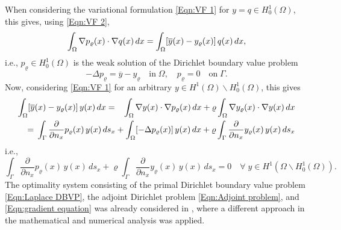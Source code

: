 \documentclass{article}
\numberwithin{equation}{section}
\begin{document}
\noindent
When considering the variational formulation \eqref{Eqn:VF 1}
for $y = q \in H^1_0(\Omega)$, this gives, using \eqref{Eqn:VF 2},
\[
  \int_\Omega \nabla p_\varrho(x) \cdot \nabla q(x) \, dx \\
  =
  \int_\Omega [\overline{y}(x) - y_\varrho(x)] \, q(x) \, dx,
\]
i.e., $p_\varrho \in H^1_0(\Omega)$ is the weak solution of the
Dirichlet boundary value problem
\begin{equation}\label{Eqn:Adjoint problem}
  - \Delta p_\varrho = \overline{y} - y_\varrho \quad \mbox{in} \; \Omega,
  \quad p_\varrho = 0 \quad \mbox{on} \; \Gamma .
\end{equation}
Now, considering \eqref{Eqn:VF 1} for an arbitrary
$y \in H^1(\Omega)\backslash H^1_0(\Omega)$, this gives
\begin{eqnarray*}
  \int_\Omega [\overline{y}(x) - y_\varrho(x)] \, y(x) \, dx
  & = & \int_\Omega \nabla y(x) \cdot \nabla p_\varrho(x) \, dx +
        \varrho \int_\Omega \nabla y_\varrho(x) \cdot \nabla y(x) \, dx \\
  && \hspace*{-4cm} = \, \int_\Gamma
     \frac{\partial}{\partial n_x} p_\varrho(x) \, y(x) \, ds_x +
     \int_\Omega [- \Delta p_\varrho(x)] \, y(x) \, dx +
     \varrho \int_\Gamma \frac{\partial}{\partial n_x}
     y_\varrho(x) \, y(x) \, ds_x 
\end{eqnarray*}
i.e.,
\begin{equation}\label{Eqn:gradient equation}
  \int_\Gamma
  \frac{\partial}{\partial n_x} p_\varrho(x) \, y(x) \, ds_x
  +
  \varrho \int_\Gamma \frac{\partial}{\partial n_x}
  y_\varrho(x) \, y(x) \, ds_x = 0 \quad
  \forall
  \; y \in H^1(\Omega \backslash H^1_0(\Omega)) .
\end{equation}
The optimality system consisting of the primal Dirichlet boundary value
problem \eqref{Eqn:Laplace DBVP}, the adjoint Dirichlet problem
\eqref{Eqn:Adjoint problem}, and \eqref{Eqn:gradient equation} was already
considered in \cite{OfPhanSteinbach2015NumerMath},
where a different approach in the mathematical and
numerical analysis was applied.


%
%
\end{document}
